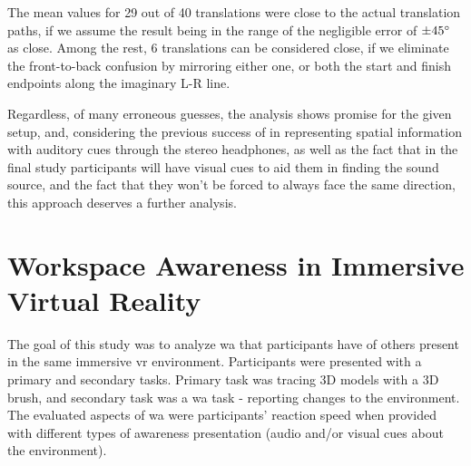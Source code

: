 The mean values for 29 out of 40 translations were close to the actual translation paths, if we assume the result being in the range of the negligible error of $\pm 45\degree$ as close. %
Among the rest, 6 translations can be considered close, if we eliminate the front-to-back confusion by mirroring either one, or both the start and finish endpoints along the imaginary L-R line.

Regardless, of many erroneous guesses, the analysis shows promise for the given setup, and, considering the previous success of \cite{gutwin_chalk_2011} in representing spatial information with auditory cues through the stereo headphones, as well as the fact that in the final study participants will have visual cues to aid them in finding the sound source, and the fact that they won't be forced to always face the same direction, this approach deserves a further analysis.
















\section{Workspace Awareness in Immersive Virtual Reality}
\label{final_study}

The goal of this study was to analyze \gls{wa} that participants have of others present in the same immersive \gls{vr} environment. Participants were presented with a primary and secondary tasks. Primary task was tracing 3D models with a 3D brush, and secondary task was a \gls{wa} task - reporting changes to the environment.
The evaluated aspects of \gls{wa} were participants’ reaction speed when provided with different types of awareness presentation (audio and/or visual cues about the environment).

